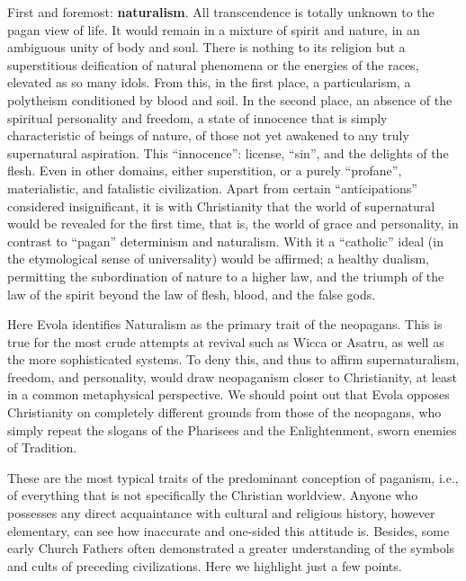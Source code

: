 First and foremost: \textbf{naturalism}. All transcendence is totally unknown to the pagan view of life. It would remain in a mixture of spirit and nature, in an ambiguous unity of body and soul. There is nothing to its religion but a superstitious deification of natural phenomena or the energies of the races, elevated as so many idols. From this, in the first place, a particularism, a polytheism conditioned by blood and soil. In the second place, an absence of the spiritual personality and freedom, a state of innocence that is simply characteristic of beings of nature, of those not yet awakened to any truly supernatural aspiration. This ``innocence'': license, ``sin'', and the delights of the flesh. Even in other domains, either superstition, or a purely ``profane'', materialistic, and fatalistic civilization. Apart from certain ``anticipations'' considered insignificant, it is with Christianity that the world of supernatural would be revealed for the first time, that is, the world of grace and personality, in contrast to ``pagan'' determinism and naturalism. With it a ``catholic'' ideal (in the etymological sense of universality) would be affirmed; a healthy dualism, permitting the subordination of nature to a higher law, and the triumph of the law of the spirit beyond the law of flesh, blood, and the false gods.

\begin{quotex}
Here Evola identifies Naturalism as the primary trait of the neopagans. This is true for the most crude attempts at revival such as Wicca or Asatru, as well as the more sophisticated systems. To deny this, and thus to affirm supernaturalism, freedom, and personality, would draw neopaganism closer to Christianity, at least in a common metaphysical perspective. We should point out that Evola opposes Christianity on completely different grounds from those of the neopagans, who simply repeat the slogans of the Pharisees and the Enlightenment, sworn enemies of Tradition.
\end{quotex}

These are the most typical traits of the predominant conception of paganism, i.e., of everything that is not specifically the Christian worldview. Anyone who possesses any direct acquaintance with cultural and religious history, however elementary, can see how inaccurate and one-sided this attitude is. Besides, some early Church Fathers often demonstrated a greater understanding of the symbols and cults of preceding civilizations. Here we highlight just a few points.

